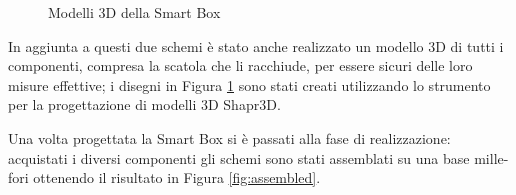 \documentclass[fleqn, 12pt]{SelfArx}
\begin{document}
\begin{figure}[htb]
  \centering
  \caption{Modelli 3D della Smart Box}
  \label{fig:models}
\end{figure}

In aggiunta a questi due schemi è stato anche realizzato un modello 3D di tutti i componenti, compresa la scatola che li racchiude, per essere sicuri delle loro misure effettive; 
i disegni in Figura \ref{fig:models} sono stati creati utilizzando lo strumento per la progettazione di modelli 3D Shapr3D\cite{shapr3d}. 

Una volta progettata la Smart Box si è passati alla fase di realizzazione: acquistati i diversi componenti gli schemi sono stati assemblati su una base mille-fori ottenendo il risultato in Figura \ref{fig:assembled}.
\end{document}
